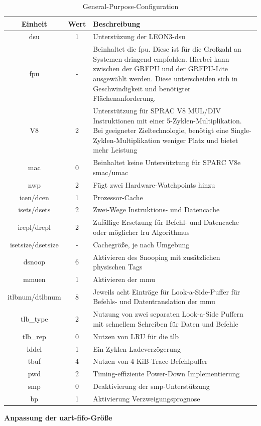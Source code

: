 \begin{table}[H]
 \centering
\begin{tabularx}{\textwidth}{|c|c|X|}
  \hline
  Einheit & Wert & Beschreibung\\
  \hline
  dsu & 1 & Unterstüzung der LEON3-\ac{dsu}\\
  \hline
  fpu & - & Beinhaltet die \ac{fpu}. Diese ist für die Großzahl an Systemen dringend empfohlen.
   Hierbei kann zwischen der GRFPU und der GRFPU-Lite ausgewählt werden. Diese unterscheiden sich in Geschwindigkeit und benötigter Flächenanforderung.\\
  \hline
  V8 & 2 & Unterstützung für SPRAC V8 MUL/DIV Instruktionen mit einer 5-Zyklen-Multiplikation. Bei geeigneter Zieltechnologie, benötigt eine Single-Zyklen-Multiplikation weniger Platz und bietet mehr Leistung\\
  \hline
  mac & 0 & Beinhaltet keine Untersütztung für SPARC V8e \ac{smac}/\ac{umac}\\
  \hline
  nwp & 2 & Fügt zwei Hardware-Watchpoints hinzu\\
  \hline
  icen/dcen & 1 & Prozessor-Cache\\
  \hline
  isets/dsets & 2 & Zwei-Wege Instruktions- und Datencache\\
  \hline
  irepl/drepl & 2 & Zufällige Ersetzung für Befehl- und Datencache oder möglicher \ac{lru} Algorithmus\\
  \hline
  isetsize/dsetsize & - & Cachegröße, je nach Umgebung\\
  \hline
  dsnoop & 6 & Aktivieren des Snooping mit zusätzlichen physischen Tags\\
  \hline
  mmuen & 1 & Aktivieren der \ac{mmu}\\
  \hline
  itlbnum/dtlbnum & 8 & Jeweils acht Einträge für Look-a-Side-Puffer für Befehls- und Datentranslation der \ac{mmu}\\
  \hline
  tlb\_type & 2 & Nutzung von zwei separaten Look-a-Side Puffern mit schnellem Schreiben für Daten und Befehle\\
  \hline
  tlb\_rep & 0 & Nutzen von LRU für die \ac{tlb}\\
  \hline
  lddel & 1 & Ein-Zyklen Ladeverzögerung\\
  \hline
  tbuf & 4 & Nutzen von 4 KiB-Trace-Befehlpuffer\\
  \hline
  pwd & 2 & Timing-effiziente Power-Down Implementierung\\
  \hline
  smp & 0 & Deaktivierung der \ac{smp}-Unterstützung\\
  \hline
  bp & 1 & Aktivierung Verzweigungsprognose\\
  \hline
  \end{tabularx}
  \caption{General-Purpose-Configuration}
  \label{tab:generalpurpose}
  \end{table}
\newpage
\textbf{Anpassung der \ac{uart}-\acs{fifo}-Größe}\\

